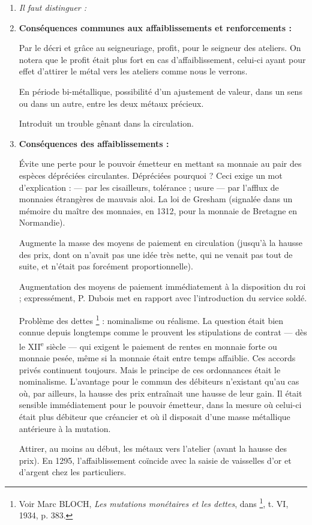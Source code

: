 \documentclass[french,twoside]{book} %
\newlength{\listmod}
\newcommand{\listhead}[1]{\hspace{-1\listmod}\emph{#1}}
\begin{document}
\begin{enumerate}[itemsep=\baselineskip,]
\item[]\listhead{Il faut distinguer :}
\item {\bfseries Conséquences communes aux affaiblissements et renforcements :}\par
Par le décri et grâce au seigneuriage, profit, pour le seigneur des ateliers. On notera que le profit était plus fort en cas d’affaiblissement, celui-ci ayant pour effet d’attirer le métal vers les ateliers comme nous le verrons.\par
En période bi-métallique, possibilité d’un ajustement de valeur, dans un sens ou dans un autre, entre les deux métaux précieux.\par
Introduit un trouble gênant dans la circulation.  
\label{p93}

\item {\bfseries Conséquences des affaiblissements :}\par
Évite une perte pour le pouvoir émetteur en mettant sa monnaie au pair des espèces dépréciées circulantes. Dépréciées pourquoi ? Ceci exige un mot d’explication : — par les cisailleurs, tolérance ; usure — par l’afflux de monnaies étrangères de mauvais aloi. La loi de Gresham (signalée dans un mémoire du maître des monnaies, en 1312, pour la monnaie de Bretagne en Normandie).\par
Augmente la masse des moyens de paiement en circulation (jusqu’à la hausse des prix, dont on n’avait pas une idée très nette, qui ne venait pas tout de suite, et n’était pas forcément proportionnelle).\par
Augmentation des moyens de paiement immédiatement à la disposition du roi ; expressément, P. Dubois met en rapport avec l’introduction du service soldé.\par
Problème des dettes \footnote{ Voir Marc BLOCH, {\itshape Les mutations monétaires et les dettes}, dans \href{http://gallica.bnf.fr/document?O=N010027}{}\footnote{\href{http://gallica.bnf.fr/document?O=N010027}{\url{http://gallica.bnf.fr/document?O=N010027}}}, t. VI, 1934, p. 383.} : nominalisme ou réalisme. La question était bien connue depuis longtemps comme le prouvent les stipulations de contrat — dès le XII\textsuperscript{e} siècle — qui exigent le paiement de rentes en monnaie forte ou monnaie pesée, même si la monnaie était entre temps affaiblie. Ces accords privés continuent toujours. Mais le principe de ces ordonnances était le nominalisme. L’avantage pour le commun des débiteurs n’existant qu’au cas où, par ailleurs, la hausse des prix entraînait une hausse de leur gain. Il était sensible immédiatement pour le pouvoir émetteur, dans la mesure où celui-ci était plus débiteur que créancier et où il disposait d’une masse métallique antérieure à la mutation.\par
Attirer, au moins au début, les métaux vers l’atelier (avant la hausse des prix). En 1295, l’affaiblissement coïncide avec la saisie de vaisselles d’or et d’argent chez les particuliers.


\end{enumerate}
\end{document}
